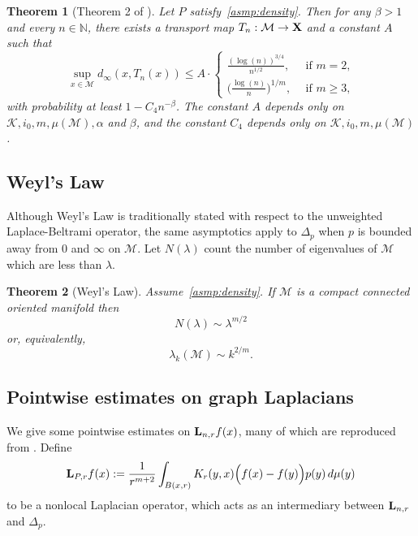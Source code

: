 \documentclass{article}
\newcommand{\1}{\mathbf{1}}
\newcommand{\Lap}{{\bf L}}
\newcommand{\mc}[1]{\mathcal{#1}}
\theoremstyle{alden}
\theoremstyle{aldenthm}
\newtheorem{theorem}{Theorem}
\theoremstyle{definition}
\theoremstyle{remark}
\begin{document}
\begin{theorem}[Theorem 2 of \citep{trillos2019}]
	\label{thm:trillos19_2}
	Let $P$ satisfy~\ref{asmp:density}. Then for any $\beta > 1$ and every $n \in \mathbb{N}$, there exists a transport map $T_n: \mc{M} \to {\bf X}$ and a constant $A$ such that
	\begin{equation*}
	\sup_{x \in \mc{M}} d_{\infty}(x,T_n(x)) \leq A \cdot 
	\begin{cases*}
	\frac{(\log(n))^{3/4}}{n^{1/2}},& ~~\textrm{if $m = 2$,} \\
	\biggl(\frac{\log(n)}{n}\biggr)^{1/m},& ~~\textrm{if $m \geq 3$,}
	\end{cases*}
	\end{equation*}
	with probability at least $1 - C_4 n^{-\beta}$. The constant $A$ depends only on $\mc{K},i_0,m,\mu(\mc{M}), \alpha$ and $\beta$, and the constant $C_4$ depends only on $\mc{K},i_0,m,\mu(\mc{M})$.
\end{theorem}

\subsection{Weyl's Law}

Although Weyl's Law is traditionally stated with respect to the unweighted Laplace-Beltrami operator, the same asymptotics apply to $\Delta_{p}$ when $p$ is bounded away from $0$ and $\infty$ on $\mc{M}$. Let $N(\lambda)$ count the number of eigenvalues of $\mc{M}$ which are less than $\lambda$.
\begin{theorem}[Weyl's Law]
	\label{thm:weyl}
	Assume~\ref{asmp:density}. If $\mc{M}$ is a compact connected oriented manifold then
	\begin{equation*}
	N(\lambda) \sim \lambda^{m/2}
	\end{equation*}
	or, equivalently,
	\begin{equation*}
	\lambda_k(\mc{M}) \sim k^{2/m}.
	\end{equation*}
\end{theorem}

\subsection{Pointwise estimates on graph Laplacians}

We give some pointwise estimates on $\Lap_{n,r}f(x)$, many of which are reproduced from \citep{calder2019}. Define
\begin{equation*}
\Lap_{P,r}f(x) := \frac{1}{r^{m + 2}} \int_{B(x,r)} K_r(y,x) \Bigl( f(x) - f(y) \Bigr) p(y) \,d\mu(y)
\end{equation*}
to be a nonlocal Laplacian operator, which acts as an intermediary between $\Lap_{n,r}$ and $\Delta_p$.
\end{document}
